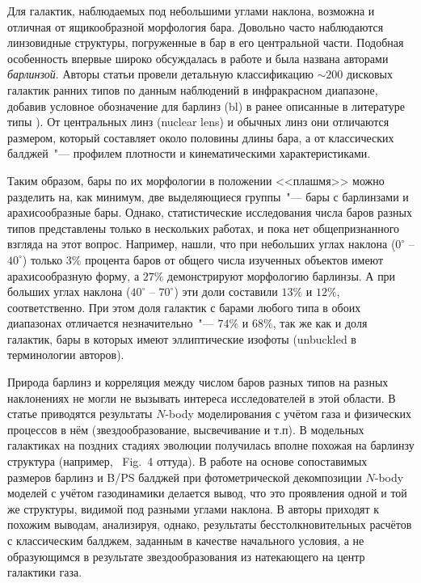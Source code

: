 \documentclass{trlnotes}
\begin{document}
Для галактик, наблюдаемых под небольшими углами наклона, возможна и отличная от ящикообразной морфология бара.
Довольно часто наблюдаются линзовидные структуры, погруженные в бар в его центральной части. Подобная особенность
впервые широко обсуждалась в работе \citet{laurikainen2011} и была названа авторами \emph{барлинзой}.
Авторы статьи провели детальную классификацию $\sim\!200$ дисковых галактик ранних типов по данным наблюдений в
инфракрасном диапазоне, добавив условное обозначение для барлинз (bl) в ранее описанные в литературе типы
\citep{devaucouleurs1959,buta2010}). От центральных линз (nuclear lens) и обычных линз они отличаются
размером, который составляет около половины длины бара, а от классических балджей~"--- профилем плотности и кинематическими
характеристиками. 

Таким образом, бары по их морфологии в положении <<плашмя>> можно разделить на, как минимум, две выделяющиеся группы~"--- бары с барлинзами и
арахисообразные бары. Однако, статистические исследования числа баров разных типов представлены только в нескольких работах, и пока нет
общепризнанного взгляда на этот вопрос. Например, \citet{li2017a} нашли, что при небольших углах наклона ($0^\circ$ -- $40^\circ$) только $3\%$
процента баров от общего числа изученных объектов имеют арахисообразную форму, а $27\%$ демонстрируют морфологию барлинзы. А при больших углах
наклона ($40^\circ$ -- $70^\circ$) эти доли составили $13\%$ и $12\%$,  соответственно.  При этом доля галактик с барами любого типа в обоих
диапазонах отличается незначительно~"--- $74\%$ и $68\%$, так же как и доля галактик, бары в которых имеют эллиптические изофоты (unbuckled в
терминологии авторов). 

Природа барлинз и корреляция между числом баров разных типов на разных наклонениях не могли не вызывать интереса исследователей в этой области.
В статье \citet{athanassoula2013a} приводятся результаты $N$-body моделирования с учётом газа и физических процессов в нём (звездообразование,
высвечивание и т.п). В модельных галактиках на поздних стадиях эволюции  получилась вполне похожая на барлинзу структура (например, ~Fig.~4
оттуда). В работе  \citet{athanassoula2015} на основе сопоставимых размеров барлинз и B/PS балджей при фотометрической декомпозиции $N$-body
моделей с учётом газодинамики делается вывод, что это проявления одной и той же структуры, видимой под разными углами наклона. В
\citet{salo2017} авторы приходят к похожим выводам, анализируя, однако, результаты бесстолкновительных расчётов с классическим балджем, заданным
в качестве начального условия, а не образующимся в результате звездообразования из  натекающего на центр галактики газа. 
\end{document}
